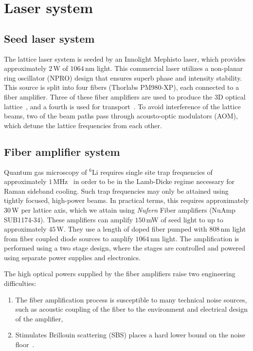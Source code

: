 \documentclass[twocolumn,aps,pra,showpacs,preprintnumbers,bibnotes]{revtex4-1}
\newcommand\Isotope[2]{\ensuremath{^{#1}\mathrm{#2}}}
\newcommand\Li{\Isotope{6}{Li}}
\begin{document}
\section{Laser system}
\subsection{Seed laser system}
The lattice laser system is seeded by an Innolight Mephisto laser, which provides approximately $2\,$W of $1064\,$nm light. 
This commercial laser utilizes a non-planar ring oscillator (NPRO) design that ensures superb phase and intensity stability. 
This source is split into four fibers (Thorlabs PM980-XP), each connected to a fiber amplifier. 
Three of these fiber amplifiers are used to produce the 3D optical lattice~\cite{Parsons2016}, and a fourth is used for transport~\cite{Huber2014}.
To avoid interference of the lattice beams, two of the beam paths pass through acousto-optic modulators (AOM), which detune the lattice frequencies from each other. 

\subsection{Fiber amplifier system}
Quantum gas microscopy of \Li{} requires single site trap frequencies of approximately $1\,$MHz~\cite{Parsons2015} in order to be in the Lamb-Dicke regime necessary for Raman sideband cooling.
Such trap frequencies may only be attained using tightly focused, high-power beams. 
In practical terms, this requires approximately $30\,$W per lattice axis, which we attain using \textit{Nufern} Fiber amplifiers (NuAmp SUB1174-34).
These amplifiers can amplify $150\,$mW of seed light to up to approximately $45\,$W. They use a length of doped fiber pumped with $808\,$nm light from fiber coupled diode sources to amplify $1064\,$nm light. 
The amplification is performed using a two stage design, where the stages are controlled and powered using separate power supplies and electronics.

The high optical powers supplied by the fiber amplifiers raise two engineering difficulties:
\begin{enumerate}
  \item The fiber amplification process is susceptible to many technical noise sources, such as acoustic coupling of the fiber to the environment and electrical design of the amplifier, 
  \item Stimulates Brillouin scattering (SBS) places a hard lower bound on the noise floor~\cite{Agrawal2013}. 
\end{enumerate}
\end{document}
